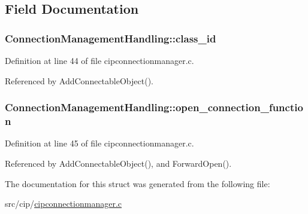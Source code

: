\subsection{\-Field \-Documentation}
\hypertarget{structConnectionManagementHandling_ab1e9a99cb9ba1e520632e4429d9a290a}{
\subsubsection[{class\-\_\-id}]{ {\bf \-Connection\-Management\-Handling\-::class\-\_\-id}}}\label{d1/d46/structConnectionManagementHandling_ab1e9a99cb9ba1e520632e4429d9a290a}


\-Definition at line 44 of file cipconnectionmanager.\-c.



\-Referenced by \-Add\-Connectable\-Object().

\hypertarget{structConnectionManagementHandling_a40ee7659db82868693852b3c569e8d41}{
\subsubsection[{open\-\_\-connection\-\_\-function}]{ {\bf \-Connection\-Management\-Handling\-::open\-\_\-connection\-\_\-function}}}\label{d1/d46/structConnectionManagementHandling_a40ee7659db82868693852b3c569e8d41}


\-Definition at line 45 of file cipconnectionmanager.\-c.



\-Referenced by \-Add\-Connectable\-Object(), and \-Forward\-Open().



\-The documentation for this struct was generated from the following file\-:\begin{DoxyCompactItemize}
\item 
src/cip/\hyperlink{cipconnectionmanager_8c}{cipconnectionmanager.\-c}\end{DoxyCompactItemize}
